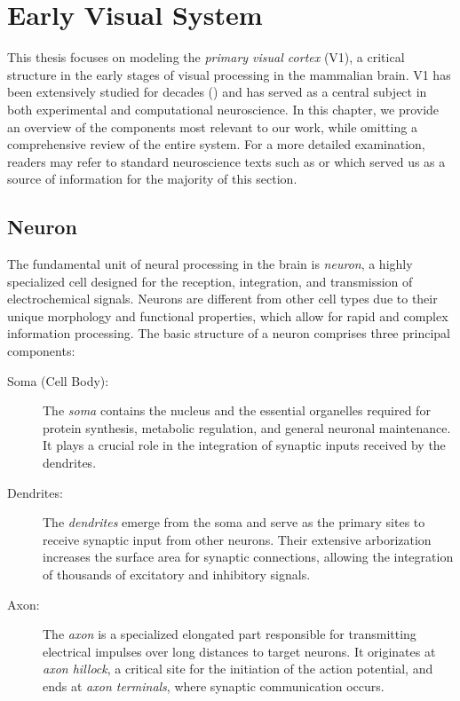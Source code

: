 \chapter{Early Visual System}
\label{chap:visual_system}
This thesis focuses on modeling the \emph{primary visual cortex} (V1), a
critical structure in the early stages of visual processing in the mammalian
brain. V1 has been extensively studied for decades (\citet{hubel1965receptive}) 
and has served as a central subject
in both experimental and computational neuroscience. In this chapter, we
provide an overview of the components most relevant to our work, while
omitting a comprehensive review of the entire system. For a more detailed
examination, readers may refer to standard neuroscience texts such as
\citet{bear2020neuroscience} or \citet{goebel2004visual} which served
us as a source of information for the majority of this section.

\section{Neuron}
\label{sec:neuron}
The fundamental unit of neural processing in the brain is \emph{neuron}, a highly
specialized cell designed for the reception, integration, and transmission of
electrochemical signals. Neurons are different from other cell types due to their
unique morphology and functional properties, which allow for rapid and complex information
processing. The basic structure of a neuron comprises three principal components:

\begin{description}
    \item[Soma (Cell Body):] The \emph{soma} contains the nucleus and the essential 
    organelles required for protein synthesis, metabolic regulation, and general 
    neuronal maintenance. It plays a crucial role in the integration of synaptic 
    inputs received by the dendrites.

    \item[Dendrites:] The \emph{dendrites} emerge from the soma and serve as the 
    primary sites to receive synaptic input from other neurons.
    Their extensive arborization increases the surface area for synaptic connections, 
    allowing the integration of thousands of excitatory and inhibitory signals.

    \item[Axon:] The \emph{axon} is a specialized elongated part responsible 
    for transmitting electrical impulses over long distances to target neurons. 
    It originates at \emph{axon hillock}, a critical site for the initiation of the 
    action potential, and ends at \emph{axon terminals}, where synaptic communication 
    occurs.
\end{description}

